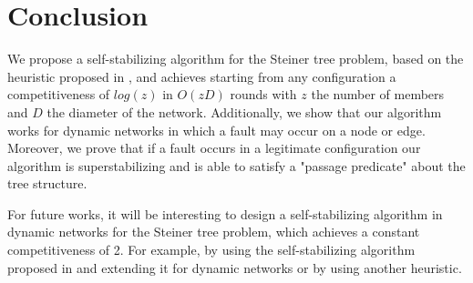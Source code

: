 \documentclass[11pt]{article}
\begin{document}
\section{Conclusion}

We propose a self-stabilizing algorithm for the Steiner tree problem, based on the heuristic proposed in \cite{ImaseWaxman91}, and achieves starting from any configuration a competitiveness of $log(z)$ in $O(zD)$ rounds with $z$ the number of members and $D$ the diameter of the network. Additionally, we show that our algorithm works for dynamic networks in which a fault may occur on a node or edge. Moreover, we prove that if a fault occurs in a legitimate configuration our algorithm is superstabilizing and is able to satisfy a "passage predicate" about the tree structure.

For future works, it will be interesting to design a self-stabilizing algorithm in dynamic networks for the Steiner tree problem, which achieves a constant competitiveness of 2. For example, by using the self-stabilizing algorithm proposed in \cite{Kakugawa_Steiner_journal} and extending it for dynamic networks or by using another heuristic.



\end{document}

